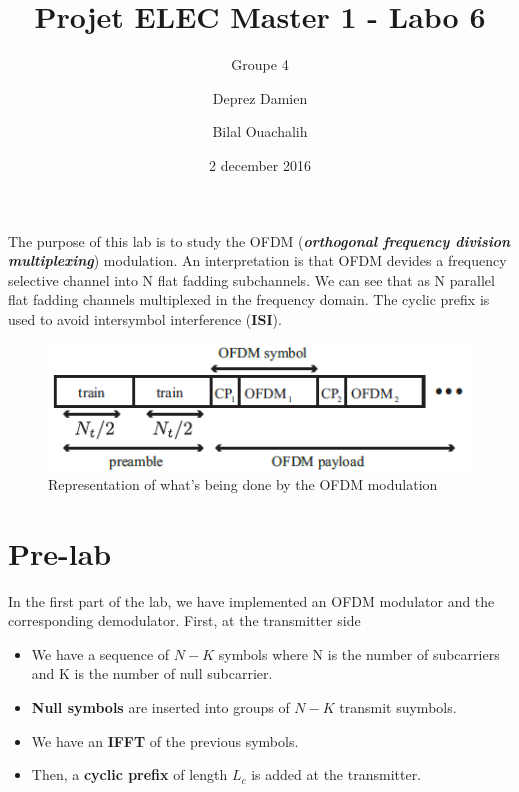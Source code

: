 \documentclass[frenchb, oneside, headings=normal]{scrartcl}
\begin{document}
\title{Projet ELEC Master 1 - Labo 6}
\subtitle{Groupe 4}
\author{Deprez Damien \and Bilal Ouachalih }
\date{2 december 2016}
\maketitle

The purpose of this lab is to study the OFDM (\textit{\textbf{orthogonal frequency division multiplexing}}) modulation. An interpretation is that OFDM devides a frequency selective channel into N flat fadding subchannels. We can see that as N parallel flat fadding channels multiplexed in the frequency domain. The cyclic prefix is used to avoid intersymbol interference (\textbf{ISI}).

\begin{figure}[!ht]
\centering
\includegraphics[scale=0.8]{img/operation_ofdm.png}
\caption{Representation of what's being done by the OFDM modulation}
\label{fig1}
\end{figure}

\section{Pre-lab}

In the first part of the lab, we have implemented an OFDM modulator  and the corresponding demodulator. First, at the transmitter side

\begin{itemize}

\item We have a sequence of $N-K$ symbols where N is the number of subcarriers and K is the number of null subcarrier.

\item \textbf{Null symbols} are inserted into groups of $N-K$ transmit suymbols.

\item We have an \textbf{IFFT} of the previous symbols.

\item Then, a \textbf{cyclic prefix} of length $L_c$ is added at the transmitter.

\end{itemize}
\end{document}

